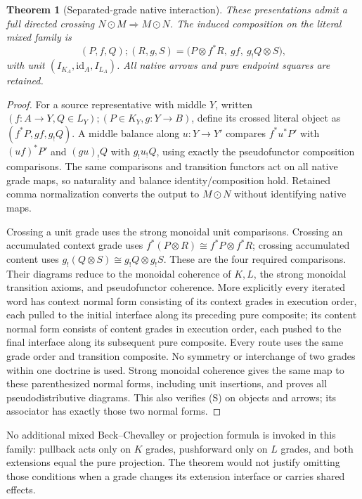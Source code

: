 \documentclass[11pt]{article}
\newtheorem{theorem}{Theorem}\newtheorem{proposition}{Proposition}
\begin{document}
\begin{theorem}[Separated-grade native interaction]
These presentations admit a full directed crossing $N\odot M\Rightarrow M\odot N$. The induced composition on the literal mixed family is
\[
 (P,f,Q);(R,g,S)
   =\bigl(P\otimes f^*R,\ gf,\ g_!Q\otimes S\bigr),\tag{S}
\]
with unit $(I_{K_A},\mathrm{id}_A,I_{L_A})$. All native arrows and pure endpoint squares are retained.
\end{theorem}
\begin{proof}
For a source representative with middle $Y$, written $(f:A\to Y,Q\in L_Y);(P\in K_Y,g:Y\to B)$, define its crossed literal object as $(f^*P,gf,g_!Q)$. A middle balance along $u:Y\to Y'$ compares $f^*u^*P'$ with $(uf)^*P'$ and $(gu)_!Q$ with $g_!u_!Q$, using exactly the pseudofunctor composition comparisons. The same comparisons and transition functors act on all native grade maps, so naturality and balance identity/composition hold. Retained comma normalization converts the output to $M\odot N$ without identifying native maps.

Crossing a unit grade uses the strong monoidal unit comparisons. Crossing an accumulated context grade uses $f^*(P\otimes R)\cong f^*P\otimes f^*R$; crossing accumulated content uses $g_!(Q\otimes S)\cong g_!Q\otimes g_!S$. These are the four required comparisons. Their diagrams reduce to the monoidal coherence of $K,L$, the strong monoidal transition axioms, and pseudofunctor coherence. More explicitly every iterated word has context normal form consisting of its context grades in execution order, each pulled to the initial interface along its preceding pure composite; its content normal form consists of content grades in execution order, each pushed to the final interface along its subsequent pure composite. Every route uses the same grade order and transition composite. No symmetry or interchange of two grades within one doctrine is used. Strong monoidal coherence gives the same map to these parenthesized normal forms, including unit insertions, and proves all pseudodistributive diagrams. This also verifies (S) on objects and arrows; its associator has exactly those two normal forms.
\end{proof}

No additional mixed Beck--Chevalley or projection formula is invoked in this family: pullback acts only on $K$ grades, pushforward only on $L$ grades, and both extensions equal the pure projection. The theorem would not justify omitting those conditions when a grade changes its extension interface or carries shared effects.
\end{document}
